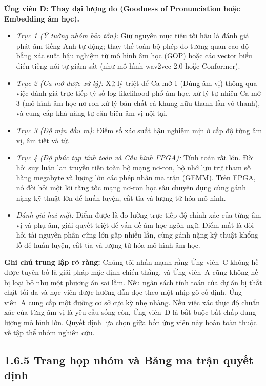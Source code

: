 \documentclass[11pt,a4paper]{article}
\begin{document}
\textbf{Ứng viên D: Thay đại lượng đo (Goodness of Pronunciation hoặc Embedding âm học).}
\begin{itemize}
    \item \textit{Trục 1 (Ý tưởng nhóm bảo tồn):} Giữ nguyên mục tiêu tối hậu là đánh giá phát âm tiếng Anh tự động; thay thế toàn bộ phép đo tương quan cao độ bằng xác suất hậu nghiệm từ mô hình âm học (GOP) hoặc các vector biểu diễn tiếng nói tự giám sát (như mô hình wav2vec 2.0 hoặc Conformer).
    \item \textit{Trục 2 (Ca mở được xử lý):} Xử lý triệt để Ca mở 1 (Đúng âm vị) thông qua việc đánh giá trực tiếp tỷ số log-likelihood phổ âm học, xử lý tự nhiên Ca mở 3 (mô hình âm học nơ-ron xử lý bản chất cả khung hữu thanh lẫn vô thanh), và cung cấp khả năng tự căn biên âm vị nội tại.
    \item \textit{Trục 3 (Độ mịn đầu ra):} Điểm số xác suất hậu nghiệm mịn ở cấp độ từng âm vị, âm tiết và từ.
    \item \textit{Trục 4 (Độ phức tạp tính toán và Cấu hình FPGA):} Tính toán rất lớn. Đòi hỏi suy luận lan truyền tiến toàn bộ mạng nơ-ron, bộ nhớ lưu trữ tham số hàng megabyte và lượng lớn các phép nhân ma trận (GEMM). Trên FPGA, nó đòi hỏi một lõi tăng tốc mạng nơ-ron học sâu chuyên dụng cùng gánh nặng kỹ thuật lớn để huấn luyện, cắt tỉa và lượng tử hóa mô hình.
    \item \textit{Đánh giá hai mặt:} Điểm được là đo lường trực tiếp độ chính xác của từng âm vị và phụ âm, giải quyết triệt để vấn đề âm học ngôn ngữ. Điểm mất là đòi hỏi tài nguyên phần cứng lớn gấp nhiều lần, cùng gánh nặng kỹ thuật khổng lồ để huấn luyện, cắt tỉa và lượng tử hóa mô hình âm học.
\end{itemize}

\textbf{Ghi chú trung lập rõ ràng:} Chúng tôi nhấn mạnh rằng Ứng viên~C không hề được tuyên bố là giải pháp mặc định chiến thắng, và Ứng viên~A cũng không hề bị loại bỏ như một phương án sai lầm. Nếu ngân sách tính toán của dự án bị thắt chặt tối đa và học viên được hướng dẫn đọc theo một nhịp gõ cố định, Ứng viên~A cung cấp một đường cơ sở cực kỳ nhẹ nhàng. Nếu việc xác thực độ chuẩn xác của từng âm vị là yêu cầu sống còn, Ứng viên~D là bắt buộc bất chấp dung lượng mô hình lớn. Quyết định lựa chọn giữa bốn ứng viên này hoàn toàn thuộc về tập thể nhóm nghiên cứu.

\subsection*{1.6.5 Trang họp nhóm và Bảng ma trận quyết định}
\end{document}

